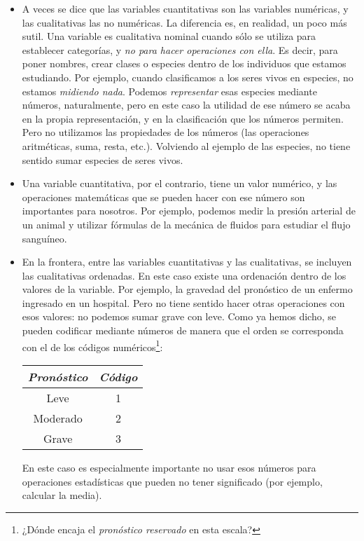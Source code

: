 \begin{itemize}
    \item A veces se dice que las variables cuantitativas son las variables numéricas, y las cualitativas las no numéricas. La diferencia es, en realidad, un poco más sutil. Una variable es {\sf cualitativa nominal} cuando {\sf sólo} se utiliza para establecer categorías, y {\em no para hacer operaciones con ella}. Es decir, para poner nombres, crear clases o especies dentro de los individuos que estamos estudiando. Por ejemplo, cuando clasificamos a los seres vivos en especies, no estamos {\em midiendo nada}. Podemos {\em representar} esas especies mediante números, naturalmente, pero en este caso la utilidad de ese número se acaba en la propia representación, y en la clasificación que los números permiten. Pero no utilizamos las propiedades de los números (las operaciones aritméticas, suma, resta, etc.). Volviendo al ejemplo de las especies, no tiene sentido sumar especies de seres vivos.

    \item Una {\sf variable cuantitativa}, por el contrario, tiene un valor numérico, y las operaciones matemáticas que se pueden hacer con ese número son importantes para nosotros. Por ejemplo, podemos medir la presión arterial de un animal y utilizar fórmulas de la mecánica de fluidos para estudiar el flujo sanguíneo.

    \item En la frontera, entre las variables cuantitativas y las cualitativas, se incluyen las {\sf cualitativas ordenadas}. En este caso existe una ordenación dentro de los valores de la variable. Por ejemplo, la gravedad del pronóstico de un enfermo ingresado en un hospital. Pero no tiene sentido hacer otras operaciones con esos valores: no podemos sumar grave con leve. Como ya hemos dicho, se pueden codificar mediante números de manera que el orden se corresponda con el de los códigos numéricos\footnote{¿Dónde encaja el {\em pronóstico reservado} en esta escala?}:
        \begin{center}
        \begin{tabular}{|c|c|}
        \hline
        {\em Pronóstico}&{\em Código}\\
        \hline
        Leve&1\\
        \hline
        Moderado&2\\
        \hline
        Grave&3\\
        \hline
        \end{tabular}
        \end{center}
        En este caso es especialmente importante no usar esos números para operaciones estadísticas que pueden no tener significado (por ejemplo, calcular la media).
\end{itemize}


